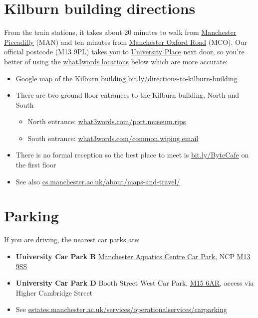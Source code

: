 \documentclass[
  12pt,
]{book}
\providecommand{\tightlist}{%
  \setlength{\itemsep}{0pt}\setlength{\parskip}{0pt}}
\begin{document}
\hypertarget{kilburn-building-directions}{%
\section{Kilburn building directions}\label{kilburn-building-directions}}

From the train stations, it takes about 20 minutes to walk from \href{https://www.nationalrail.co.uk/stations_destinations/man.aspx}{Manchester Piccadilly} (MAN) and ten minutes from \href{https://www.nationalrail.co.uk/stations/mco/details.aspx}{Manchester Oxford Road} (MCO). Our official postcode (M13 9PL) takes you to \href{http://www.conference.manchester.ac.uk/venues/search/details/?property=10}{University Place} next door, so you're better of using the \href{https://www.bbc.co.uk/news/uk-england-49319760}{what3words locations} \citep{what3words} below which are more accurate:

\begin{itemize}
\tightlist
\item
  Google map of the Kilburn building \href{http://bit.ly/directions-to-kilburn-building}{bit.ly/directions-to-kilburn-building}
\item
  There are two ground floor entrances to the Kilburn building, North and South

  \begin{itemize}
  \tightlist
  \item
    North entrance: \href{https://what3words.com/port.museum.rips}{what3words.com/port.museum.rips}
  \item
    South entrance: \href{https://what3words.com/common.wiping.email}{what3words.com/common.wiping.email}
  \end{itemize}
\item
  There is no formal reception so the best place to meet is \href{http://bit.ly/ByteCafe}{bit.ly/ByteCafe} on the first floor
\item
  See also \href{https://www.cs.manchester.ac.uk/about/maps-and-travel/}{cs.manchester.ac.uk/about/maps-and-travel/}
\end{itemize}

\hypertarget{parking}{%
\section{Parking}\label{parking}}

If you are driving, the nearest car parks are:

\begin{itemize}
\tightlist
\item
  \textbf{University Car Park B} \href{https://www.ncp.co.uk/find-a-car-park/car-parks/manchester-aquatic-centre-jv/}{Manchester Aquatics Centre Car Park}, NCP \href{http://maps.google.co.uk/maps?q=M13+9SS}{M13 9SS}
\item
  \textbf{University Car Park D} Booth Street West Car Park, \href{http://maps.google.co.uk/maps?q=M15+6AR}{M15 6AR}, access via Higher Cambridge Street
\item
  See \href{https://www.estates.manchester.ac.uk/services/operationalservices/carparking/}{estates.manchester.ac.uk/services/operationalservices/carparking}
\end{itemize}
\end{document}
